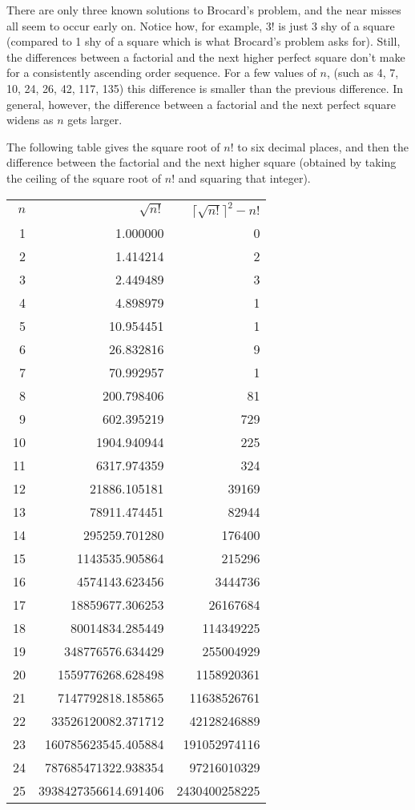\documentclass[12pt]{article}
\begin{document}
There are only three known solutions to Brocard's problem, and the near misses all seem to occur early on. Notice how, for example, 3! is just 3 shy of a square (compared to 1 shy of a square which is what Brocard's problem asks for). Still, the differences between a factorial and the next higher perfect square don't make for a consistently ascending order sequence. For a few values of $n$, (such as 4, 7, 10, 24, 26, 42, 117, 135) this difference is smaller than the previous difference. In general, however, the difference between a factorial and the next perfect square widens as $n$ gets larger.

The following table gives the square root of $n!$ to six decimal places, and then the difference between the factorial and the next higher square (obtained by taking the ceiling of the square root of $n!$ and squaring that integer).

\begin{tabular}{|r|r|r|}
$n$ & $\sqrt{n!}$ & $\lceil \sqrt{n!} \rceil^2 - n!$ \\
1 & 1.000000 & 0 \\ 
2 & 1.414214 & 2 \\ 
3 & 2.449489 & 3 \\ 
4 & 4.898979 & 1 \\ 
5 & 10.954451 & 1 \\ 
6 & 26.832816 & 9 \\ 
7 & 70.992957 & 1 \\ 
8 & 200.798406 & 81 \\ 
9 & 602.395219 & 729 \\ 
10 & 1904.940944 & 225 \\ 
11 & 6317.974359 & 324 \\ 
12 & 21886.105181 & 39169 \\ 
13 & 78911.474451 & 82944 \\ 
14 & 295259.701280 & 176400 \\ 
15 & 1143535.905864 & 215296 \\ 
16 & 4574143.623456 & 3444736 \\ 
17 & 18859677.306253 & 26167684 \\ 
18 & 80014834.285449 & 114349225 \\ 
19 & 348776576.634429 & 255004929 \\ 
20 & 1559776268.628498 & 1158920361 \\ 
21 & 7147792818.185865 & 11638526761 \\ 
22 & 33526120082.371712 & 42128246889 \\ 
23 & 160785623545.405884 & 191052974116 \\ 
24 & 787685471322.938354 & 97216010329 \\ 
25 & 3938427356614.691406 & 2430400258225 \\
\end{tabular}
\end{document}
